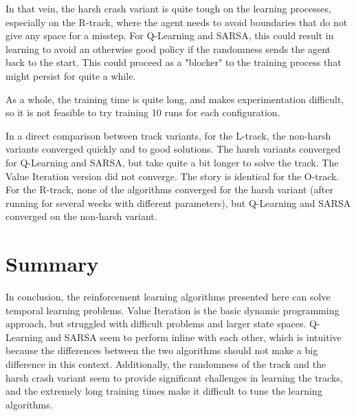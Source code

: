 \documentclass{amsart}
\begin{document}
    In that vein, the harsh crash variant is quite tough on the learning processes,
    especially on the R-track, where the agent needs to avoid boundaries that
    do not give any space for a misstep. For Q-Learning and SARSA, this could result in
    learning to avoid an otherwise good policy if the randomness sends the agent
    back to the start. This could proceed as a "blocker" to the training process
    that might persist for quite a while.

    As a whole, the training time is quite long, and makes experimentation difficult,
    so it is not feasible to try training 10 runs for each configuration.

    In a direct comparison between track variants, for the L-track, the non-harsh variants converged
    quickly and to good solutions. The harsh variants converged for Q-Learning and SARSA, but take quite a bit longer to solve the track.
    The Value Iteration version did not converge.
    The story is identical for the O-track. For the R-track, none of the algorithms converged for the
    harsh variant (after running for several weeks with different parameters), but Q-Learning and SARSA
    converged on the non-harsh variant.


    \section{Summary}
    In conclusion, the reinforcement learning algorithms presented here can solve temporal learning problems.
    Value Iteration is the basic dynamic programming approach, but struggled with difficult problems
    and larger state spaces. Q-Learning and SARSA seem to perform inline with each other, which is intuitive because
    the differences between the two algorithms should not make a big difference in this context.
    Additionally, the randomness of the track and the harsh crash variant seem to provide significant
    challenges in learning the tracks, and the extremely long training times make it difficult to
    tune the learning algorithms.



\end{document}

